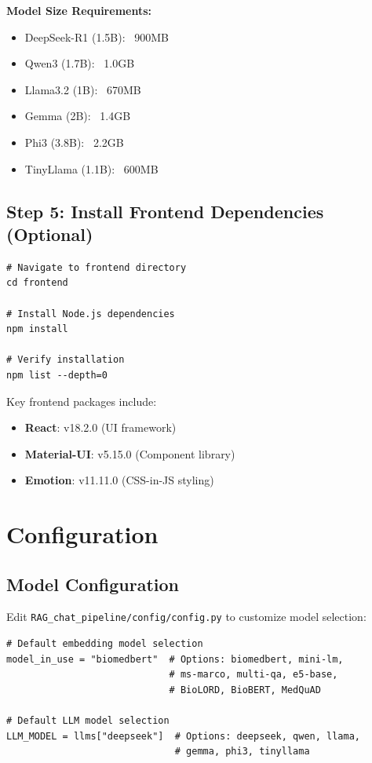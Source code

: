 \textbf{Model Size Requirements:}
\begin{itemize}
    \item DeepSeek-R1 (1.5B): ~900MB
    \item Qwen3 (1.7B): ~1.0GB
    \item Llama3.2 (1B): ~670MB
    \item Gemma (2B): ~1.4GB
    \item Phi3 (3.8B): ~2.2GB
    \item TinyLlama (1.1B): ~600MB
\end{itemize}

\subsection{Step 5: Install Frontend Dependencies (Optional)}

\begin{verbatim}
# Navigate to frontend directory
cd frontend

# Install Node.js dependencies
npm install

# Verify installation
npm list --depth=0
\end{verbatim}

Key frontend packages include:
\begin{itemize}
    \item \textbf{React}: v18.2.0 (UI framework)
    \item \textbf{Material-UI}: v5.15.0 (Component library)
    \item \textbf{Emotion}: v11.11.0 (CSS-in-JS styling)
\end{itemize}

\section{Configuration}

\subsection{Model Configuration}

Edit \texttt{RAG\_chat\_pipeline/config/config.py} to customize model selection:

\begin{verbatim}
# Default embedding model selection
model_in_use = "biomedbert"  # Options: biomedbert, mini-lm, 
                             # ms-marco, multi-qa, e5-base, 
                             # BioLORD, BioBERT, MedQuAD

# Default LLM model selection  
LLM_MODEL = llms["deepseek"]  # Options: deepseek, qwen, llama,
                              # gemma, phi3, tinyllama
\end{verbatim}

